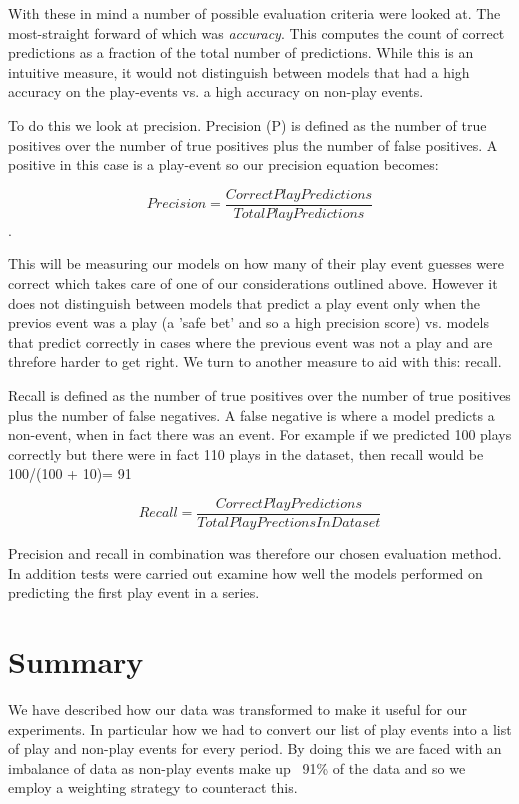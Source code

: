 With these in mind a number of possible evaluation criteria were looked at. The most-straight forward of which was \textit{accuracy}. This computes the count of correct predictions as a fraction of the total number of predictions. While this is an intuitive measure, it would not distinguish between models that had a high accuracy on the play-events vs. a high accuracy on non-play events. 

To do this we look at precision. Precision (P) is defined as the number of true positives over the number of true positives plus the number of false positives. A positive in this case is a play-event so our precision equation becomes:

$$Precision = \frac{Correct Play Predictions}{Total Play Predictions}$$. 

This will be measuring our models on how many of their play event guesses were correct which takes care of one of our considerations outlined above. However it does not distinguish between models that predict a play event only when the previos event was a play (a 'safe bet' and so a high precision score) vs. models that predict correctly in cases where the previous event was not a play and are threfore harder to get right. We turn to another measure to aid with this: recall.

Recall is defined as the number of true positives over the number of true positives plus the number of false negatives. A false negative is where a model predicts a non-event, when in fact there was an event. For example if we predicted 100 plays correctly but there were in fact 110 plays in the dataset, then recall would be 100/(100 + 10)= 91%

$$Recall = \frac{CorrectPlayPredictions}{TotalPlayPrectionsInDataset}$$

Precision and recall in combination was therefore our chosen evaluation method. In addition tests were carried out examine how well the models performed on predicting the first play event in a series.



\section{Summary}

We have described how our data was transformed to make it useful for our experiments. In particular how we had to convert our list of play events into a list of play and non-play events for every period. By doing this we are faced with an imbalance of data as non-play events make up ~91\% of the data and so we employ a weighting strategy to counteract this.

